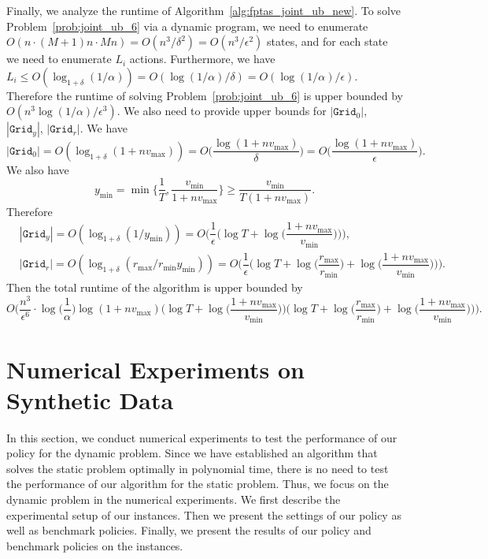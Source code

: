 \documentclass[mnsc,non-blindrev]{informs3}
\theoremstyle{definition}
\begin{document}
\begin{appendices}{\Large{}}
{Finally, we analyze the runtime of Algorithm~\ref{alg:fptas_joint_ub_new}. To solve Problem~\eqref{prob:joint_ub_6} via a dynamic program, we need to enumerate $O(n\cdot (M+1)n\cdot Mn)=O(n^3/\delta^2)=O(n^3/\epsilon^2)$ states, and for each state we need to enumerate $L_i$ actions. Furthermore, we have $L_i\leq O(\log_{1+\delta}(1/\alpha))=O(\log(1/\alpha)/\delta)=O(\log(1/\alpha)/\epsilon)$. Therefore the runtime of solving Problem~\eqref{prob:joint_ub_6} is upper bounded by $O(n^3\log(1/\alpha)/\epsilon^3)$. We also need to provide upper bounds for $|\texttt{Grid}_0|$, $|\texttt{Grid}_y|$, $|\texttt{Grid}_r|$. We have
\begin{equation*}
|\texttt{Grid}_0|=O(\log_{1+\delta}(1+nv_{\max}))=O\Big(\dfrac{\log(1+nv_{\max})}{\delta}\Big)=O\Big(\dfrac{\log(1+nv_{\max})}{\epsilon}\Big).
\end{equation*}
We also have
\begin{equation*}
y_{\min}=\min\Big\{\dfrac{1}{T},\dfrac{v_{\min}}{1+nv_{\max}}\Big\}\geq \dfrac{v_{\min}}{T(1+nv_{\max})}.
\end{equation*}
Therefore
\begin{align*}
&|\texttt{Grid}_y|=O(\log_{1+\delta}(1/y_{\min}))=O\Big(\dfrac{1}{\epsilon}\Big(\log T+\log\Big(\dfrac{1+nv_{\max}}{v_{\min}}\Big)\Big)\Big),\\
&|\texttt{Grid}_r|=O(\log_{1+\delta}(r_{\max}/r_{\min}y_{\min}))=O\Big(\dfrac{1}{\epsilon}\Big(\log T+\log\Big(\dfrac{r_{\max}}{r_{\min}}\Big)+\log\Big(\dfrac{1+nv_{\max}}{v_{\min}}\Big)\Big)\Big).
\end{align*}
Then the total runtime of the algorithm is upper bounded by
\begin{equation*}
O\Big(\dfrac{n^3}{\epsilon^6}\cdot\log\Big(\dfrac{1}{\alpha}\Big)\log(1+nv_{\max})\Big(\log T+\log\Big(\dfrac{1+nv_{\max}}{v_{\min}}\Big)\Big)\Big(\log T+\log\Big(\dfrac{r_{\max}}{r_{\min}}\Big)+\log\Big(\dfrac{1+nv_{\max}}{v_{\min}}\Big)\Big)\Big).
\end{equation*}

}

{ 
\section{Numerical Experiments on Synthetic Data}\label{sec:numerical}

In this section, we conduct numerical experiments to test the performance of our policy for the dynamic problem. Since we have established an algorithm that solves the static problem optimally in polynomial time, there is no need to test the performance of our algorithm for the static problem. Thus, we focus on the dynamic problem in the numerical experiments. We first describe the experimental setup of our instances. Then we present the settings of our policy as well as benchmark policies. Finally, we present the results of our policy and benchmark policies on the instances.

}
\end{appendices}
\end{document}
